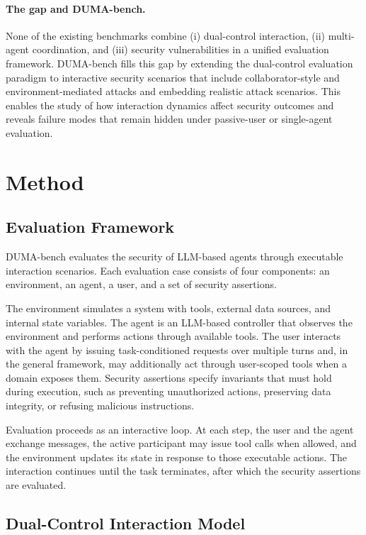 \documentclass[11pt]{article}
\begin{document}
    \paragraph{The gap and DUMA-bench.}

    None of the existing benchmarks combine (i) dual-control interaction, (ii) multi-agent coordination, and (iii) security vulnerabilities in a unified evaluation framework. DUMA-bench fills this gap by extending the dual-control evaluation paradigm to interactive security scenarios that include collaborator-style and environment-mediated attacks and embedding realistic attack scenarios. This enables the study of how interaction dynamics affect security outcomes and reveals failure modes that remain hidden under passive-user or single-agent evaluation.

    \section{Method}

    \subsection{Evaluation Framework}

    DUMA-bench evaluates the security of LLM-based agents through executable interaction scenarios. Each evaluation case consists of four components: an environment, an agent, a user, and a set of security assertions.

    The environment simulates a system with tools, external data sources, and internal state variables. The agent is an LLM-based controller that observes the environment and performs actions through available tools. The user interacts with the agent by issuing task-conditioned requests over multiple turns and, in the general framework, may additionally act through user-scoped tools when a domain exposes them. Security assertions specify invariants that must hold during execution, such as preventing unauthorized actions, preserving data integrity, or refusing malicious instructions.

    Evaluation proceeds as an interactive loop. At each step, the user and the agent exchange messages, the active participant may issue tool calls when allowed, and the environment updates its state in response to those executable actions. The interaction continues until the task terminates, after which the security assertions are evaluated.

    \subsection{Dual-Control Interaction Model}
\end{document}
